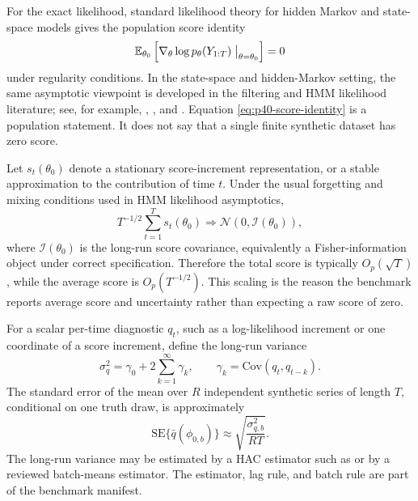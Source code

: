 \documentclass[11pt]{article}
\numberwithin{equation}{section}
\newcommand{\E}{\mathbb E}
\newcommand{\N}{\mathcal N}
\begin{document}
For the exact likelihood, standard likelihood theory for hidden Markov and
state-space models gives the population score identity
\begin{equation}
  \E_{\theta_0}
  \left[
  \nabla_\theta \log p_\theta(Y_{1:T})
  \bigm|_{\theta=\theta_0}
  \right]
  =
  0
  \label{eq:p40-score-identity}
\end{equation}
under regularity conditions.  In the state-space and hidden-Markov setting, the
same asymptotic viewpoint is developed in the filtering and HMM likelihood
literature; see, for example, \citet{cappe2005hmm},
\citet{douc2004markovregime}, and \citet{douc2011consistencyhmm}.  Equation
\eqref{eq:p40-score-identity} is a population statement.  It does not say that a
single finite synthetic dataset has zero score.

Let \(s_t(\theta_0)\) denote a stationary score-increment representation, or a
stable approximation to the contribution of time \(t\).  Under the usual
forgetting and mixing conditions used in HMM likelihood asymptotics,
\begin{equation}
  T^{-1/2}
  \sum_{t=1}^{T} s_t(\theta_0)
  \Rightarrow
  \N(0,\mathcal I(\theta_0)),
  \label{eq:p40-score-clt}
\end{equation}
where \(\mathcal I(\theta_0)\) is the long-run score covariance, equivalently a
Fisher-information object under correct specification.  Therefore the total
score is typically \(O_p(\sqrt T)\), while the average score is
\(O_p(T^{-1/2})\).  This scaling is the reason the benchmark reports average
score and uncertainty rather than expecting a raw score of zero.

For a scalar per-time diagnostic \(q_t\), such as a log-likelihood increment or
one coordinate of a score increment, define the long-run variance
\begin{equation}
  \sigma_q^2
  =
  \gamma_0
  +
  2\sum_{k=1}^{\infty}\gamma_k,
  \qquad
  \gamma_k=\mathrm{Cov}(q_t,q_{t-k}).
  \label{eq:p40-long-run-variance}
\end{equation}
The standard error of the mean over \(R\) independent synthetic series of length
\(T\), conditional on one truth draw, is approximately
\begin{equation}
  \mathrm{SE}\{\bar q(\phi_{0,b})\}
  \approx
  \sqrt{\frac{\sigma_{q,b}^2}{RT}}.
  \label{eq:p40-conditional-se}
\end{equation}
The long-run variance may be estimated by a HAC estimator such as
\citet{neweywest1987} or by a reviewed batch-means estimator.  The estimator,
lag rule, and batch rule are part of the benchmark manifest.
\end{document}
